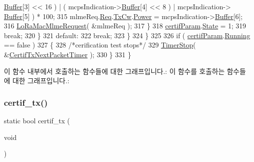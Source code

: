 \begin{DoxyCode}
      \mbox{\hyperlink{structs_mcps_indication_a095175dabcb7cd83bddf2bea50371121}{Buffer}}[3] << 16 ) | ( mcpsIndication->\mbox{\hyperlink{structs_mcps_indication_a095175dabcb7cd83bddf2bea50371121}{Buffer}}[4] << 8 ) | mcpsIndication->
      \mbox{\hyperlink{structs_mcps_indication_a095175dabcb7cd83bddf2bea50371121}{Buffer}}[5] ) * 100;
315               mlmeReq.\mbox{\hyperlink{structs_mlme_req_ae8fae82634858192f75515c1b7daaadc}{Req}}.\mbox{\hyperlink{unions_mlme_req_1_1u_mlme_param_aa69808af2b2999fc4b8b409b593173ab}{TxCw}}.\mbox{\hyperlink{structs_mlme_req_tx_cw_ab44615b5dd16068c5a1bfb228b72c081}{Power}} = mcpsIndication->\mbox{\hyperlink{structs_mcps_indication_a095175dabcb7cd83bddf2bea50371121}{Buffer}}[6];
316               \mbox{\hyperlink{group___l_o_r_a_m_a_c_ga097113f30feecc17c780940ff74af33e}{LoRaMacMlmeRequest}}( &mlmeReq );
317           \}
318           \mbox{\hyperlink{lora-test_8c_afed64ac962fb28f92cbc92acb72b0b7a}{certifParam}}.\mbox{\hyperlink{struct_compliance_test__s_a9ac4c1f881137da2601ed5d333bb5989}{State}} = 1;
319           \textcolor{keywordflow}{break};
320         \}
321         \textcolor{keywordflow}{default}:                  
322           \textcolor{keywordflow}{break};
323         \}
324     \}
325   
326     \textcolor{keywordflow}{if} ( \mbox{\hyperlink{lora-test_8c_afed64ac962fb28f92cbc92acb72b0b7a}{certifParam}}.\mbox{\hyperlink{struct_compliance_test__s_ae2e97f1ebd7c956e2c68d1209eabd4b1}{Running}} == \textcolor{keyword}{false} )
327     \{
328       \textcolor{comment}{/*cerification test stops*/}
329       \mbox{\hyperlink{time_server_8c_a8ae899c4e8a9abf49d825d6959aa6bcb}{TimerStop}}( &\mbox{\hyperlink{lora-test_8c_a0c9bb346324d81b31bd460c40b151cdd}{CertifTxNextPacketTimer}} );
330     \}
331 \}
\end{DoxyCode}
이 함수 내부에서 호출하는 함수들에 대한 그래프입니다.\+:
이 함수를 호출하는 함수들에 대한 그래프입니다.\+:
\mbox{\label{lora-test_8c_a735361add977554215fd3e1e70b74760}} 
\subsubsection{\texorpdfstring{certif\+\_\+tx()}{certif\_tx()}}
{\footnotesize\ttfamily static bool certif\+\_\+tx (\begin{DoxyParamCaption}\item[{void}]{ }\end{DoxyParamCaption})\hspace{0.3cm}{\ttfamily [static]}}



